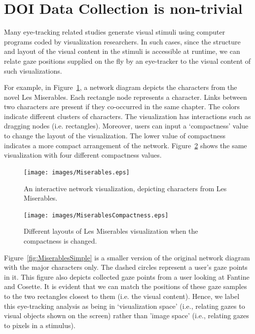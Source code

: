 \section{DOI Data Collection is non-trivial}
\label{sec:DOINonTrivial}
Many eye-tracking related studies generate visual stimuli using computer programs coded by visualization researchers. In such cases, since the structure and layout of the visual content in the stimuli is accessible at runtime, we can relate gaze positions supplied on the fly by an eye-tracker to the visual content of such visualizations.

For example, in Figure~\ref{fig:Miserables}, a network diagram depicts the characters from the novel Les Miserables. Each rectangle node represents a character. Links between two characters are present if they co-occurred in the same chapter. The colors indicate different clusters of characters. The visualization has interactions such as dragging nodes (i.e. rectangles). Moreover, users can input a `compactness' value to change the layout of the visualization. The lower value of compactness indicates a more compact arrangement of the network. Figure~\ref{fig:MiserablesCompactness} shows the same visualization with four different compactness values. 


\begin{figure}[htbp]
  \centering
  \texttt{[image: images/Miserables.eps]}
  \caption{An interactive network visualization, depicting characters from Les Miserables.}
    \label{fig:Miserables}
\end{figure}

\begin{figure}[htbp]
  \centering
  \texttt{[image: images/MiserablesCompactness.eps]}
  \caption{Different layouts of Les Miserables visualization when the compactness is changed.}
    \label{fig:MiserablesCompactness}
\end{figure}

Figure~\ref{fig:MiserablesSimple} is a smaller version of the original network diagram with the major characters only. The dashed circles represent a user's gaze points in it. This figure also depicts collected gaze points from a user looking at Fantine and Cosette. It is evident that we can match the positions of these gaze samples to the two rectangles closest to them (i.e. the visual content). Hence, we label this eye-tracking analysis as being in `visualization space' (i.e., relating gazes to visual objects shown on the screen) rather than 'image space' (i.e., relating gazes to pixels in a stimulus).

